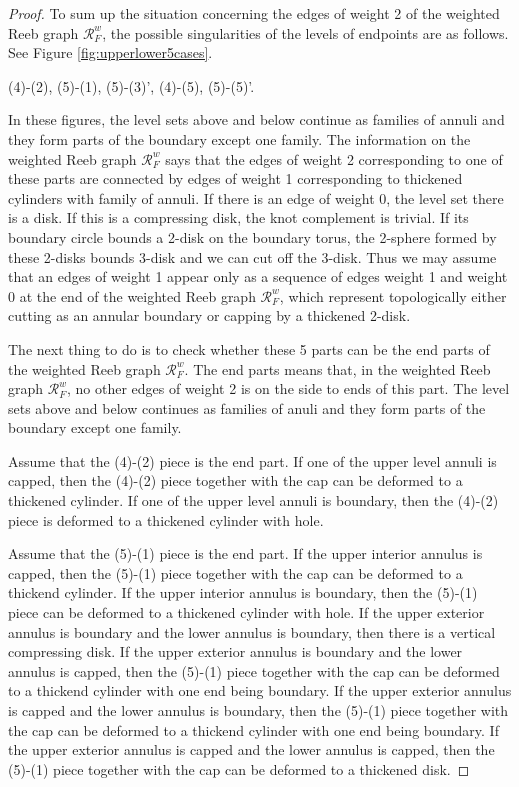 \documentclass{amsart}
\numberwithin{equation}{section}
\begin{document}
\begin{proof}
To sum up the situation concerning the edges of weight 2 of the weighted Reeb graph $\mathcal{R}_F^w$, the possible singularities of the levels of endpoints are as follows. See Figure \ref{fig:upperlower5cases}.
\begin{center}
(4)-(2), (5)-(1), (5)-(3)', (4)-(5), (5)-(5)'.
\end{center}

In these figures, the level sets above and below continue as families of annuli and they form parts of the boundary except one family. The information on the weighted Reeb graph $\mathcal{R}^w_F$ says that the edges of weight 2 corresponding to one of these parts are connected by edges of weight 1 corresponding to thickened cylinders with family of annuli. If there is an edge of weight 0, the level set there is a disk. If this is a compressing disk, the knot complement is trivial. If its boundary circle bounds a 2-disk on the boundary torus, the 2-sphere formed by these 2-disks bounds 3-disk and we can cut off the 3-disk. Thus we may assume that an edges of weight 1 appear only as a sequence of edges weight 1 and weight 0 at the end of the weighted Reeb graph $\mathcal{R}^w_F$, which 
represent  topologically either cutting as an annular boundary or capping by a thickened 2-disk.



The next thing to do is to check whether these 5 parts can be the end parts of the weighted Reeb graph $\mathcal{R}_F^w$. The end parts means that, in the weighted Reeb graph $\mathcal{R}_F^w$, no other edges of weight 2 is on the side to ends of this part. The level sets above and below continues as families of anuli and they form parts of the boundary except one family.

Assume that the (4)-(2) piece is the end part.
If one of the upper level annuli is capped, then the (4)-(2) piece together with the cap can be deformed to a thickened cylinder.
If one of the upper level annuli is boundary, 
then the (4)-(2) piece is deformed to a thickened cylinder with hole.

Assume that the (5)-(1) piece is the end part.
If the upper interior annulus is capped, then the (5)-(1) piece together with the cap can be deformed to a thickend cylinder. If the upper interior annulus is boundary, 
then the (5)-(1) piece can be deformed to a thickened cylinder with hole.
If the upper exterior annulus is boundary and the lower annulus is boundary, then there is a vertical compressing disk.  
If the upper exterior annulus is boundary and the lower annulus is capped, 
then the (5)-(1) piece together with the cap can be deformed to a thickend cylinder with one end being boundary.
If the upper exterior annulus is capped and the lower annulus is boundary, then the (5)-(1) piece together with the cap can be deformed to a thickend cylinder with one end being boundary.
If the upper exterior annulus is capped and the lower annulus is capped, then 
the (5)-(1) piece together with the cap can be deformed to a thickened disk.


\end{proof}
\end{document}
